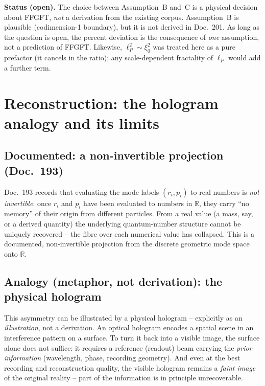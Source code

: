 \medskip

\noindent
\textbf{Status (open).} The choice between Assumption~B and~C is a physical
decision about FFGFT, \emph{not} a derivation from the existing corpus.
Assumption~B is plausible (codimension-1 boundary), but it is not derived in
Doc.~201. As long as the question is open, the percent deviation is the
consequence of \emph{one} assumption, not a prediction of FFGFT. Likewise,
$\ell_P^2 \sim \xi_0^2$ was treated here as a pure prefactor (it cancels in
the ratio); any scale-dependent fractality of $\ell_P$ would add a further
term.

\section{Reconstruction: the hologram analogy and its limits}

\subsection*{Documented: a non-invertible projection (Doc.~193)}

Doc.~193 records that evaluating the mode labels $(r_i, p_i)$ to real numbers
is \emph{not invertible}: once $r_i$ and $p_i$ have been evaluated to numbers
in $\mathbb{R}$, they carry \enquote{no memory} of their origin from
different particles. From a real value (a mass, say, or a derived quantity)
the underlying quantum-number structure cannot be uniquely recovered -- the
fibre over each numerical value has collapsed. This is a documented,
non-invertible projection from the discrete geometric mode space onto
$\mathbb{R}$.

\subsection*{Analogy (metaphor, not derivation): the physical hologram}

This asymmetry can be illustrated by a physical hologram -- explicitly as an
\emph{illustration}, not a derivation. An optical hologram encodes a spatial
scene in an interference pattern on a surface. To turn it back into a visible
image, the surface alone does not suffice: it requires a reference (readout)
beam carrying the \emph{prior information} (wavelength, phase, recording
geometry). And even at the best recording and reconstruction quality, the
visible hologram remains a \emph{faint image} of the original reality -- part
of the information is in principle unrecoverable.

